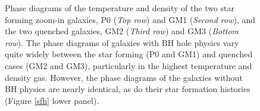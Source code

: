 \documentclass[]{emulateapj}
\begin{document}
\begin{figure}[h!]
\centerline{
}
\caption[]{Phase diagrams of the temperature and density of the two star forming zoom-in galaxies, P0 (\textit{Top row}) and GM1 (\textit{Second row}), and the two quenched galaxies, GM2 (\textit{Third row}) and GM3 (\textit{Bottom row}). The phase diagrams of galaxies with BH hole physics vary quite widely between the star forming (P0 and GM1) and quenched cases (GM2 and GM3), particularly in the highest temperature and density gas. However, the phase diagrams of the galaxies without BH physics are nearly identical, as do their star formation histories (Figure \ref{sfh} lower panel).}
\label{phasediagrams}
\end{figure}
\end{document}
